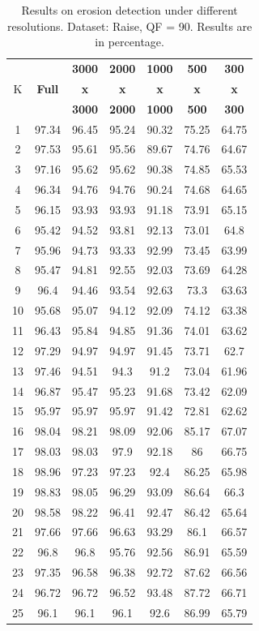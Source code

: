 \documentclass[review]{elsarticle}
\begin{document}
\begin{longtable}{c|cccccc}
	\caption{Results on erosion detection under different resolutions. Dataset: Raise, QF = 90. Results are in percentage.}
	\label{table:resolutionerosion}\\
	\hline\hline
	& &\textbf{3000}&\textbf{2000}&\textbf{1000}&\textbf{500}&\textbf{300}\\
	K &\textbf{Full}&\textbf{x}&\textbf{x}&\textbf{x}&\textbf{x}&\textbf{x}\\
	&&\textbf{3000}&\textbf{2000}&\textbf{1000}&\textbf{500}&\textbf{300}\\
	\hline
	1&97.34&96.45&95.24&90.32&75.25&64.75\\
	2&97.53&95.61&95.56&89.67&74.76&64.67\\
	3&97.16&95.62&95.62&90.38&74.85&65.53\\
	4&96.34&94.76&94.76&90.24&74.68&64.65\\
	5&96.15&93.93&93.93&91.18&73.91&65.15\\
	6&95.42&94.52&93.81&92.13&73.01&64.8\\
	7&95.96&94.73&93.33&92.99&73.45&63.99\\
	8&95.47&94.81&92.55&92.03&73.69&64.28\\
	9&96.4&94.46&93.54&92.63&73.3&63.63\\
	10&95.68&95.07&94.12&92.09&74.12&63.38\\
	11&96.43&95.84&94.85&91.36&74.01&63.62\\
	12&97.29&94.97&94.97&91.45&73.71&62.7\\
	13&97.46&94.51&94.3&91.2&73.04&61.96\\
	14&96.87&95.47&95.23&91.68&73.42&62.09\\
	15&95.97&95.97&95.97&91.42&72.81&62.62\\
	16&98.04&98.21&98.09&92.06&85.17&67.07\\
	17&98.03&98.03&97.9&92.18&86&66.75\\
	18&98.96&97.23&97.23&92.4&86.25&65.98\\
	19&98.83&98.05&96.29&93.09&86.64&66.3\\
	20&98.58&98.22&96.41&92.47&86.42&65.64\\
	21&97.66&97.66&96.63&93.29&86.1&66.57\\
	22&96.8&96.8&95.76&92.56&86.91&65.59\\
	23&97.35&96.58&96.38&92.72&87.62&66.56\\
	24&96.72&96.72&96.52&93.48&87.72&66.71\\
	25&96.1&96.1&96.1&92.6&86.99&65.79\\

\end{longtable}
\end{document}
